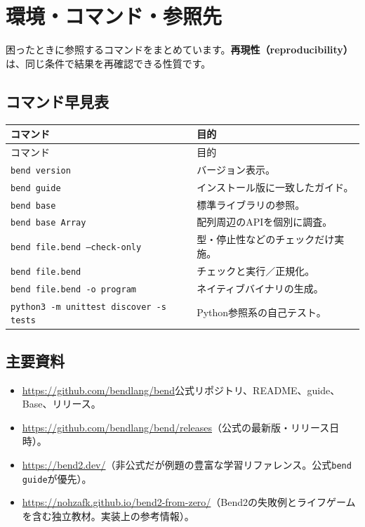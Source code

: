 \documentclass[11pt,a4paper,openany]{book}
\newcommand{\code}[1]{\texttt{#1}}
\newcommand{\term}[1]{\textbf{#1}}
\begin{document}
\chapter{環境・コマンド・参照先}
\begin{tcolorbox}[colback=blue!3,colframe=blue!16,boxrule=.35pt,arc=1mm,left=3mm,right=3mm,top=2mm,bottom=2mm]
\small 困ったときに参照するコマンドをまとめています。\term{再現性（reproducibility）}は、同じ条件で結果を再確認できる性質です。
\end{tcolorbox}

\section{コマンド早見表}
\begin{longtable}{@{}L{59mm}p{89mm}@{}}
\toprule
コマンド & 目的\\
\midrule
\endfirsthead
\toprule コマンド & 目的\\\midrule\endhead
\code{bend version} & バージョン表示。\\
\code{bend guide} & インストール版に一致したガイド。\\
\code{bend base} & 標準ライブラリの参照。\\
\code{bend base Array} & 配列周辺のAPIを個別に調査。\\

\code{bend file.bend --check-only} & 型・停止性などのチェックだけ実施。\\
\code{bend file.bend} & チェックと実行／正規化。\\
\code{bend file.bend -o program} & ネイティブバイナリの生成。\\



\code{python3 -m unittest discover -s tests} & Python参照系の自己テスト。\\
\bottomrule
\end{longtable}
\section{主要資料}
\begin{itemize}
\item \url{https://github.com/bendlang/bend}\newline 公式リポジトリ、README、guide、Base、リリース。
\item \url{https://github.com/bendlang/bend/releases}（公式の最新版・リリース日時）。
\item \url{https://bend2.dev/}（非公式だが例題の豊富な学習リファレンス。公式\code{bend guide}が優先）。
\item \url{https://nohzafk.github.io/bend2-from-zero/}（Bend2の失敗例とライフゲームを含む独立教材。実装上の参考情報）。
\end{itemize}
\end{document}
